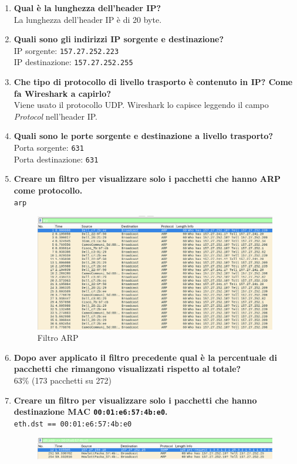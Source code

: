 \documentclass[a4paper,12pt]{article}
\begin{document}
\begin{enumerate}
  \item \textbf{Qual è la lunghezza dell'header IP?}\\
    La lunghezza dell'header IP è di 20 byte.
  \item \textbf{Quali sono gli indirizzi IP sorgente e destinazione?}\\
    IP sorgente: \texttt{157.27.252.223}\\
    IP destinazione: \texttt{157.27.252.255}
  \item \textbf{Che tipo di protocollo di livello trasporto è contenuto in IP? Come fa Wireshark a capirlo?}\\
    Viene usato il protocollo UDP. Wireshark lo capisce leggendo il campo \emph{Protocol} nell'header IP.
  \item \textbf{Quali sono le porte sorgente e destinazione a livello trasporto?}\\
    Porta sorgente: \texttt{631}\\
    Porta destinazione: \texttt{631}
  \item \textbf{Creare un filtro per visualizzare solo i pacchetti che hanno ARP come protocollo.}\\
    \texttt{arp}
    \begin{figure}[h]
      \centering
      \includegraphics[width=0.6\linewidth]{src/filtroARP.png}
      \caption{Filtro ARP}
    \end{figure}
  \item \textbf{Dopo aver applicato il filtro precedente qual è la percentuale di pacchetti che rimangono visualizzati rispetto al totale?}\\
    63\% (173 pacchetti su 272)
  \item \textbf{Creare un filtro per visualizzare solo i pacchetti che hanno destinazione MAC \texttt{00:01:e6:57:4b:e0}.}\\
    \texttt{eth.dst == 00:01:e6:57:4b:e0}
    \begin{figure}[h]
      \centering
      \includegraphics[width=0.6\linewidth]{src/filtro_dest_MAC.png}

\end{figure}
\end{enumerate}
\end{document}
